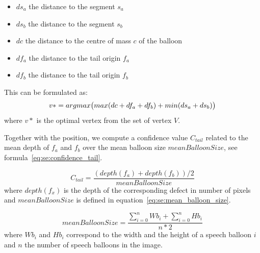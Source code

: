 \begin{itemize}
   \item $ds_a$ the distance to the segment $s_a$
   \item $ds_b$ the distance to the segment $s_b$
   \item $dc$ the distance to the centre of mass $c$ of the balloon
   \item $df_a$ the distance to the tail origin $f_a$
   \item $df_b$ the distance to the tail origin $f_b$
 \end{itemize} 

This can be formulated as:
\begin{equation}\label{eq:se:optimisation}
   v* = argmax\big( max(dc+df_a+df_b) + min(ds_a + ds_b) \big)\\
 \end{equation}
 where $v*$ is the optimal vertex from the set of vertex $V$.

Together with the position, we compute a confidence value $C_{tail}$ related to the mean depth of $f_a$ and $f_b$ over the mean balloon size $meanBalloonSize$, see formula~\ref{eq:se:confidence_tail}.

\begin{equation}
\label{eq:se:confidence_tail}
  C_{tail} = \frac{(depth(f_a)+depth(f_b))/2}{meanBalloonSize}
\end{equation}
where $depth(f_x)$ is the depth of the corresponding defect in number of pixels and $meanBalloonSize$ is defined in equation~\ref{eq:se:mean_balloon_size}.


\begin{equation}
  \label{eq:se:mean_balloon_size}
  meanBalloonSize = \frac{\sum\limits_{i=0}^n Wb_i + \sum\limits_{i=0}^n Hb_i}{n * 2}  
\end{equation}
where $Wb_i$ and $Hb_i$ correspond to the width and the height of a speech  balloon $i$ and $n$ the number of speech balloons in the image.


